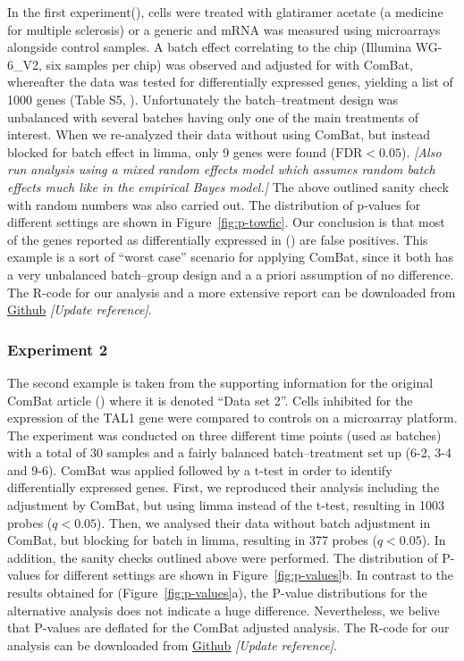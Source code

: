 \documentclass{bio}
\newcommand\NB[1]{\textcolor{NBcol}{\textit{#1}}}
\newcommand\NOTE[1]{\NB{[#1]}}
\begin{document}
In the first experiment(\citealp{Towfic2014}), cells were treated with glatiramer acetate (a medicine for multiple sclerosis) or a generic and mRNA was measured using microarrays alongside control samples. A batch effect correlating to the chip (Illumina WG-6\_V2, six samples per chip) was observed and adjusted for with ComBat, whereafter the data was tested for differentially expressed genes, yielding a list of 1000 genes (Table S5, \citealp{Towfic2014}). Unfortunately the batch--treatment design was unbalanced with several batches having only one of the main treatments of interest. When we re-analyzed their data without using ComBat, but instead blocked for batch effect in limma, only 9 genes were found ($\text{FDR}<0.05$). \NOTE{Also run analysis using a mixed random effects model which assumes random batch effects much like in the empirical Bayes model.} The above outlined sanity check with random numbers was also carried out. The distribution of p-values for different settings are shown in Figure~\ref{fig:p-towfic}.  Our conclusion is that most of the genes reported as differentially expressed in (\citealp{Towfic2014}) are false positives. This example is a sort of ``worst case'' scenario for applying ComBat, since it both has a very unbalanced batch--group design and a a priori assumption of no difference. The R-code for our analysis and a more extensive report can be downloaded from \href{https://github.com/vegardny/combat_tests.git}{Github} \NOTE{Update reference}.


\subsubsection{Experiment 2}

The second example is taken from the supporting information for the original ComBat article (\citealp{Johnson2007}) where it is denoted ``Data set 2''. Cells inhibited for the expression of the TAL1 gene were compared to controls on a microarray platform. The experiment was conducted on three different time points (used as batches) with a total of 30 samples and a fairly balanced batch--treatment set up (6-2, 3-4 and 9-6). ComBat was applied followed by a t-test in order to identify differentially expressed genes. First, we reproduced their analysis including the adjustment by ComBat, but using limma instead of the t-test, resulting in 1003 probes ($q<0.05$).  Then, we analysed their data without batch adjustment in ComBat, but blocking for batch in limma, resulting in 377 probes ($q<0.05$). In addition, the sanity checks outlined above were performed. The distribution of P-values for different settings are shown in Figure~\ref{fig:p-values}b. In contrast to the results obtained for\citealp{Towfic2014} (Figure~\ref{fig:p-values}a), the P-value distributions for the alternative analysis does not indicate a huge difference. Nevertheless, we belive that  P-values are deflated for the ComBat adjusted analysis. The R-code for our analysis can be downloaded from \href{https://github.com/vegardny/combat_tests.git}{Github} \NOTE{Update reference}.
\end{document}

